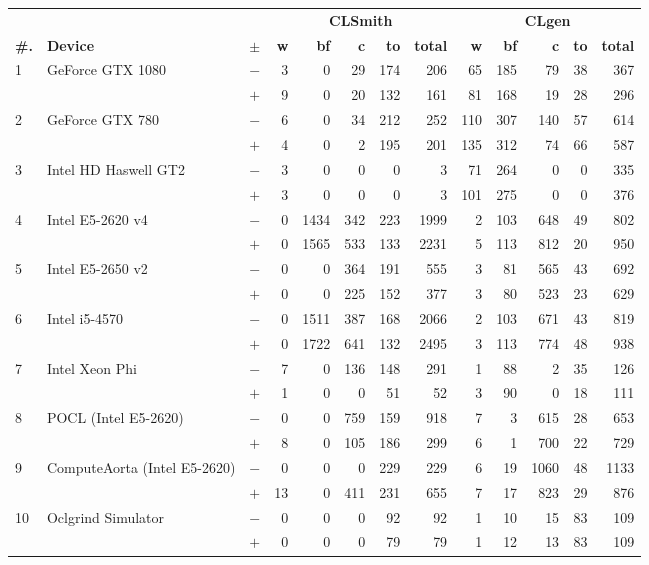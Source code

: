   \begin{tabular}{lll | rrrrr | rrrrr }
  \toprule
  & & & \multicolumn{5}{c|}{\textbf{CLSmith}} & \multicolumn{5}{c}{\textbf{CLgen}} \\
  \textbf{\#.} & \textbf{Device} & $\pm$ &
  \textbf{w} & \textbf{bf} & \textbf{c} & \textbf{to} & \textbf{total} &
  \textbf{w} & \textbf{bf} & \textbf{c} & \textbf{to} & \textbf{total} \\
  \midrule
  \multirow{ 2}{*}{1} & \multirow{ 2}{*}{GeForce GTX 1080} & $-$ & 3 & 0 & 29 & 174 & 206       & 65 & 185 & 79 & 38 & 367 \\& & $+$ & 9 & 0 & 20 & 132 & 161 & 81 & 168 & 19 & 28 & 296 \\
\hline
\multirow{ 2}{*}{2} & \multirow{ 2}{*}{GeForce GTX 780} & $-$ & 6 & 0 & 34 & 212 & 252       & 110 & 307 & 140 & 57 & 614 \\& & $+$ & 4 & 0 & 2 & 195 & 201 & 135 & 312 & 74 & 66 & 587 \\
\hline
\multirow{ 2}{*}{3} & \multirow{ 2}{*}{Intel HD Haswell GT2} & $-$ & 3 & 0 & 0 & 0 & 3       & 71 & 264 & 0 & 0 & 335 \\& & $+$ & 3 & 0 & 0 & 0 & 3 & 101 & 275 & 0 & 0 & 376 \\
\hline
\multirow{ 2}{*}{4} & \multirow{ 2}{*}{Intel E5-2620 v4} & $-$ & 0 & 1434 & 342 & 223 & 1999       & 2 & 103 & 648 & 49 & 802 \\& & $+$ & 0 & 1565 & 533 & 133 & 2231 & 5 & 113 & 812 & 20 & 950 \\
\hline
\multirow{ 2}{*}{5} & \multirow{ 2}{*}{Intel E5-2650 v2} & $-$ & 0 & 0 & 364 & 191 & 555       & 3 & 81 & 565 & 43 & 692 \\& & $+$ & 0 & 0 & 225 & 152 & 377 & 3 & 80 & 523 & 23 & 629 \\
\hline
\multirow{ 2}{*}{6} & \multirow{ 2}{*}{Intel i5-4570} & $-$ & 0 & 1511 & 387 & 168 & 2066       & 2 & 103 & 671 & 43 & 819 \\& & $+$ & 0 & 1722 & 641 & 132 & 2495 & 3 & 113 & 774 & 48 & 938 \\
\hline
\multirow{ 2}{*}{7} & \multirow{ 2}{*}{Intel Xeon Phi} & $-$ & 7 & 0 & 136 & 148 & 291       & 1 & 88 & 2 & 35 & 126 \\& & $+$ & 1 & 0 & 0 & 51 & 52 & 3 & 90 & 0 & 18 & 111 \\
\hline
\multirow{ 2}{*}{8} & \multirow{ 2}{*}{POCL (Intel E5-2620)} & $-$ & 0 & 0 & 759 & 159 & 918       & 7 & 3 & 615 & 28 & 653 \\& & $+$ & 8 & 0 & 105 & 186 & 299 & 6 & 1 & 700 & 22 & 729 \\
\hline
\multirow{ 2}{*}{9} & \multirow{ 2}{*}{ComputeAorta (Intel E5-2620)} & $-$ & 0 & 0 & 0 & 229 & 229       & 6 & 19 & 1060 & 48 & 1133 \\& & $+$ & 13 & 0 & 411 & 231 & 655 & 7 & 17 & 823 & 29 & 876 \\
\hline
\multirow{ 2}{*}{10} & \multirow{ 2}{*}{Oclgrind Simulator} & $-$ & 0 & 0 & 0 & 92 & 92       & 1 & 10 & 15 & 83 & 109 \\& & $+$ & 0 & 0 & 0 & 79 & 79 & 1 & 12 & 13 & 83 & 109 \\
  \bottomrule
\end{tabular}

